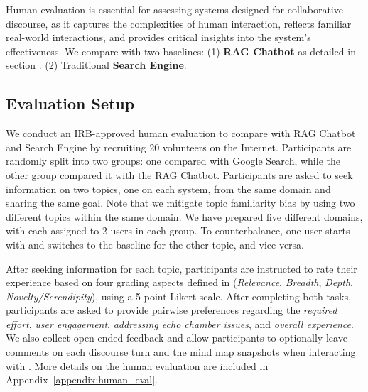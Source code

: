 Human evaluation is essential for assessing systems designed for collaborative discourse, as it captures the complexities of human interaction, reflects familiar real-world interactions, and provides critical insights into the system’s effectiveness. We compare \system with two baselines: (1) \textbf{RAG Chatbot} as detailed in section . (2) Traditional \textbf{Search Engine}.
\subsection{Evaluation Setup}
We conduct an IRB-approved human evaluation to compare \system with RAG Chatbot and Search Engine by recruiting 20 volunteers on the Internet. Participants are randomly split into two groups: one compared \system with Google Search, while the other group compared it with the RAG Chatbot. Participants are asked to seek information on two topics, one on each system, from the same domain and sharing the same goal. Note that we mitigate topic familiarity bias by using two different topics within the same domain.
We have prepared five different domains, with each assigned to 2 users in each group. To counterbalance, one user starts with \system and switches to the baseline for the other topic, and vice versa. 


After seeking information for each topic, participants are instructed to rate their experience based on four grading aspects defined in  (\textit{Relevance}, \textit{Breadth}, \textit{Depth}, \textit{Novelty/Serendipity}), using a 5-point Likert scale. After completing both tasks, participants are asked to provide pairwise preferences regarding the \textit{required effort}, \textit{user engagement}, \textit{addressing echo chamber issues}, and \textit{overall experience}. We also collect open-ended feedback and allow participants to optionally leave comments on each discourse turn and the mind map snapshots when interacting with \system. More details on the human evaluation are included in Appendix~\ref{appendix:human_eval}.